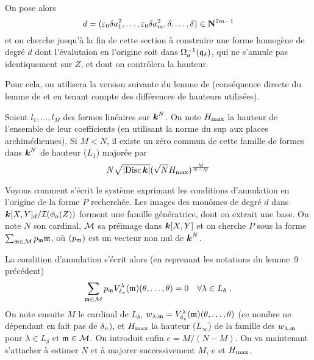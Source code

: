 On pose alors
\[
  d = (\varepsilon_0\delta a_1^2, \ldots, \varepsilon_0\delta a_m^2, \delta, \ldots, \delta)
  \in \mathbf{N}^{2m-1}
\]
et on cherche jusqu'à la fin de cette section à construire une forme homogène de
degré $d$ dont l'évalutaion en l'origine soit dans $\Omega_a^{-1}({\mathfrak q}_\delta)$,
qui ne s'annule pas identiquement sur $Z$, et dont on contrôlera la hauteur.

Pour cela, on utilisera la version suivante du lemme de 
(conséquence directe du lemme de  et  en tenant compte
des différences de hauteurs utilisées).

\begin{fait}
  Soient $l_1, \ldots, l_M$ des formes linéaires sur $\boldsymbol{k}^N$. On note $H_{\mathrm{max}}$
  la hauteur de l'ensemble de leur coefficients (en utilisant la norme du sup
  aux places archimédiennes). Si $M < N$, il existe un zéro commun de cette
  famille de formes dans $\boldsymbol{k}^N$ de hauteur ($L_1$) majorée par
  \[
    N \sqrt{\left\lvert\operatorname{Disc}\boldsymbol{k}\right\rvert} ( \sqrt N H_{\mathrm{max}} )^\frac M{N-M}
  \]
\end{fait}

Voyons comment s'écrit le système exprimant les conditions d'annulation en
l'origine de la forme $P$ recherchée. Les images des monômes de degré $d$ dans
$\boldsymbol{k}[X, Y]_d / \mathcal I(\phi_a(Z))$ forment une famille génératrice, dont on
extrait une base.  On note $N$ son cardinal, ${\mathcal M}$ sa préimage dans $\boldsymbol{k}[X,
Y]$ et on cherche $P$ sous la forme $\sum_{{\mathfrak m}\in{\mathcal M}} p_{\mathfrak m} {\mathfrak m}$,
où  $(p_{\mathfrak m})$ est un vecteur non nul de $\boldsymbol{k}^N$.

La condition d'annulation s'écrit alors (en reprenant les notations du lemme~9
précédent)
\[
  \sum_{{\mathfrak m}\in{\mathcal M}}
  p_{\mathfrak m} V_{\delta\smash{_v}}^\lambda({\mathfrak m})(\theta, \ldots, \theta)
  = 0 \quad
  \forall \lambda\in L_\delta \text{ .}
\]
On note ensuite $M$ le cardinal de $L_\delta$, $w_{\lambda, {\mathfrak m}} =
V_{\delta\smash{_v}}^\lambda({\mathfrak m})(\theta, \ldots, \theta)$ (ce nombre ne dépendant en fait pas
de ${\delta\smash{_v}}$), et $H_{\mathrm{max}}$ la hauteur ($L_\infty$) de la famille des $w_{\lambda,
  {\mathfrak m}}$ pour $\lambda \in L_\delta$ et ${\mathfrak m} \in {\mathcal M}$. On introduit
enfin $e = M/(N-M)$. On va maintenant s'attacher à estimer $N$ et à majorer
successivement $M$, $e$ et $H_{\mathrm{max}}$.

